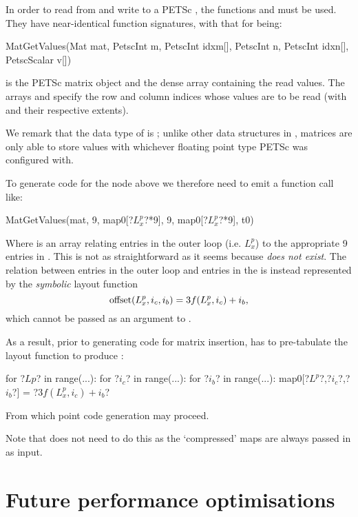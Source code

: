 \documentclass[thesis]{subfiles}
\begin{document}
In order to read from and write to a PETSc , the functions  and  must be used.
They have near-identical function signatures, with that for  being:
\begin{cinline}
  MatGetValues(Mat mat,
               PetscInt m, PetscInt idxm[],
               PetscInt n, PetscInt idxn[],
               PetscScalar v[])
\end{cinline}
 is the PETSc matrix object and  the dense array containing the read values.
The arrays  and  specify the row and column indices whose values are to be read (with  and  their respective extents).

We remark that the data type of  is ; unlike other data structures in , matrices are only able to store values with whichever floating point type PETSc was configured with.

To generate code for the  node above we therefore need to emit a function call like:
\begin{cinline}
  MatGetValues(mat, 9, map0[?$L^p_x$?*9], 9, map0[?$L^p_x$?*9], t0)
\end{cinline}
Where  is an array relating entries in the outer loop (i.e. $L^p_x$) to the appropriate 9 entries in .
This is not as straightforward as it seems because  \emph{does not exist}.
The relation between entries in the outer loop and entries in the  is instead represented by the \emph{symbolic} layout function
\begin{equation}
  \textnormal{offset}(L^p_x,i_c,i_b) = 3 f(L^p_x,i_c) + i_b,
\end{equation}
which cannot be passed as an argument to .

As a result, prior to generating code for matrix insertion,  has to pre-tabulate the layout function to produce :
\begin{pyinline}
  for ?$Lp$? in range(...):
    for ?$i_c$? in range(...):
      for ?$i_b$? in range(...):
        map0[?$L^p$?,?$i_c$?,?$i_b$?] = ?$3 f(L^p_x,i_c) + i_b$?
\end{pyinline}
From which point code generation may proceed.

Note that  does not need to do this as the `compressed' maps are always passed in as input.

\section{Future performance optimisations}
\label{sec:codegen_optimisation}
\end{document}

